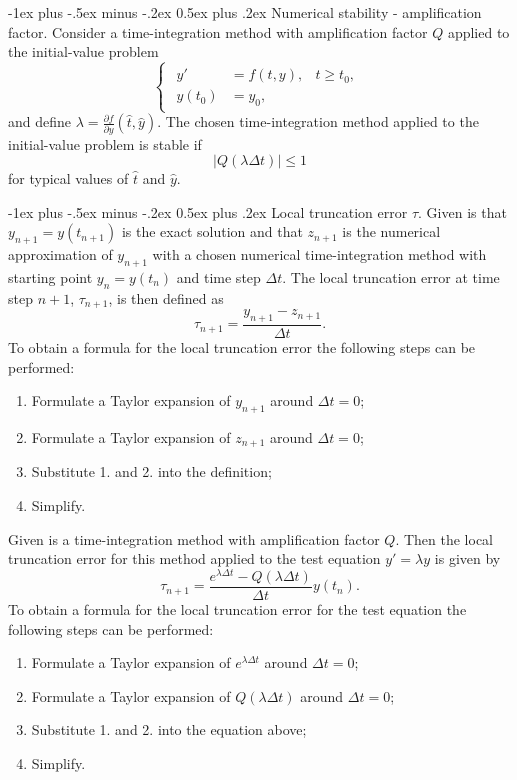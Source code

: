 \documentclass[10pt,landscape,a4paper]{article}
\makeatletter
\renewcommand{\section}{\@startsection{section}{1}{0mm}%
	{-1ex plus -.5ex minus -.2ex}%
	{0.5ex plus .2ex}%
	{\normalfont\large\bfseries}}
\makeatother
\begin{document}
\begin{multicols}{3}
		\section{Numerical stability - amplification factor.}
		Consider a time-integration method with amplification factor $ Q $ applied to the initial-value problem
		\[
			\begin{cases}
				\begin{aligned}
					y'&=f(t,y), &t\geq t_0, \\ y(t_0)&=y_0,&
				\end{aligned}
			\end{cases}
		\]
		and define $ \lambda = \frac{\partial f}{\partial y}(\hat{t},\hat{y}) $. The chosen time-integration method applied to the initial-value problem is stable if
		\[
			|Q(\lambda\Delta t)| \leq 1
		\]
		for typical values of $ \hat{t} $ and $ \hat{y} $.
		
		\section{Local truncation error $ \tau $.}
		Given is that $ y_{n+1}=y(t_{n+1}) $ is the exact solution and that $ z_{n+1} $ is the numerical approximation of $ y_{n+1} $ with a chosen numerical time-integration method with starting point $ y_n=y(t_n) $ and time step $ \Delta t $. The local truncation error at time step $ n+1 $, $ \tau_{n+1} $, is then defined as
		\[
			\tau_{n+1}=\frac{y_{n+1}-z_{n+1}}{\Delta t}.
		\]
		To obtain a formula for the local truncation error the following steps can be performed:
			\begin{enumerate}
				\item Formulate a Taylor expansion of $ y_{n+1} $ around $ \Delta t=0 $;
				\item Formulate a Taylor expansion of $ z_{n+1} $ around $ \Delta t=0 $;
				\item Substitute 1. and 2. into the definition;
				\item Simplify.
			\end{enumerate}
		Given is a time-integration method with amplification factor $ Q $. Then the local truncation error for this method applied to the test equation $ y'=\lambda y $ is given by
		\[
			\tau_{n+1}=\frac{e^{\lambda\Delta t}-Q(\lambda\Delta t)}{\Delta t}y(t_n).
		\]
		To obtain a formula for the local truncation error for the test equation the following steps can be performed:
			\begin{enumerate}
				\item Formulate a Taylor expansion of $ e^{\lambda\Delta t} $ around $ \Delta t=0 $;
				\item Formulate a Taylor expansion of $ Q(\lambda\Delta t) $ around $ \Delta t=0 $;
				\item Substitute 1. and 2. into the equation above;
				\item Simplify.
			\end{enumerate}
		

\end{multicols}
\end{document}
